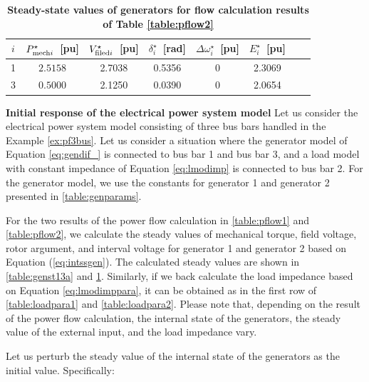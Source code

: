 \documentclass[graybox, envcountchap]{svmult}
\begin{document}
\begin{table}[h]
\medskip
 \caption{\textbf{Steady-state values of generators for flow calculation results of Table \ref{table:pflow2}}}
 \label{table:genst13b}
 \centering
  \begin{tabular}{cccccccc}
   \hline
$i$ &  $P_{{\rm mech}i}^{\star}$~[pu] & $V_{{\rm filed}i}^{\star}$~[pu] & $\delta_i^{\star}$~[rad] & $\Delta \omega_i^{\star}$~[pu] & $E_i^{\star}$~[pu] \\
   \hline \hline
1 & $2.5158$ & 2.7038 & 0.5356 & 0 & 2.3069 \\
3 & $0.5000$ & 2.1250 & 0.0390 & 0 & 2.0654 \\
   \hline
  \end{tabular}
\end{table}


\begin{example}{\textbf{Initial response of the electrical power system
model}}\label{ex:inires}
Let us consider the electrical power system model consisting of three bus bars
handled in the Example \ref{ex:pf3bus}.  Let us consider a situation where the
generator model of Equation \ref{eq:gendif_} is connected to bus bar 1 and bus
bar 3, and a load model with constant impedance of Equation \ref{eq:lmodimp} is
connected to bus bar 2.  For the generator model, we use the constants for
generator 1 and generator 2 presented in \ref{table:genparams}.

For the two results of the power flow calculation in \ref{table:pflow1} and
\ref{table:pflow2}, we calculate the steady values of mechanical torque, field
voltage, rotor argument, and interval voltage for generator 1 and generator 2
based on Equation (\ref{eq:intssgen}).  The calculated steady values are shown
in \ref{table:genst13a} and \ref{table:genst13b}.  Similarly, if we back
calculate the load impedance based on Equation \ref{eq:lmodimppara}, it can be
obtained as in the first row of \ref{table:loadpara1} and \ref{table:loadpara2}.
Please note that, depending on the result of the power flow calculation, the
internal state of the generators, the steady value of the external input, and
the load impedance vary.

Let us perturb the steady value of the internal state of the generators as the
initial value.  Specifically:


\end{example}
\end{document}
